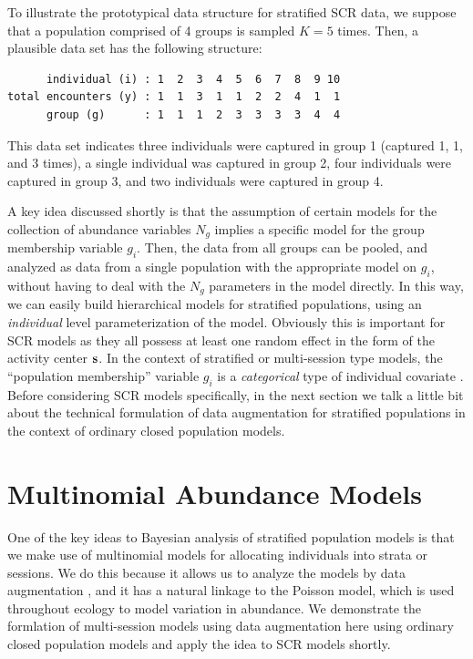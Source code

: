 To illustrate the prototypical data structure for stratified SCR data,
we suppose that a population comprised of 4 groups is sampled
$K=5$ times. Then, a plausible data set has the following structure:
\begin{verbatim}
      individual (i) : 1  2  3  4  5  6  7  8  9 10
total encounters (y) : 1  1  3  1  1  2  2  4  1  1
      group (g)      : 1  1  1  2  3  3  3  3  4  4
\end{verbatim}
This data set indicates three individuals were captured in
group 1 (captured 1, 1, and 3 times), a single individual was
captured in group 2, four individuals were captured in group
3, and two individuals were captured in group 4.

A key idea discussed shortly is that the assumption of certain models
for the collection of abundance variables $N_{g}$ implies a specific
model for the group membership variable $g_{i}$.  Then, the data from
all groups can be pooled, and analyzed as data from a single
population with the appropriate model on $g_{i}$, without having to
deal with the $N_{g}$ parameters in the model directly. In this way,
we can easily build hierarchical models for stratified populations,
using an {\it individual} level parameterization of the
model. Obviously this is important for SCR models as they all possess
at least one random effect in the form of the activity center ${\bf
  s}$.  In the context of stratified or multi-session type models, the
``population membership'' variable $g_{i}$ is a {\it categorical} type
of individual covariate \citep{huggins:1989, alho:1990, royle:2009}.
Before considering SCR models specifically, in the next section we
talk a little bit about the technical formulation of data augmentation
for stratified populations in the context of ordinary closed
population models.


\section{Multinomial Abundance Models}

One of the key ideas to Bayesian analysis of stratified population
models is that we make use of multinomial models for allocating
individuals into strata or sessions. We do this because it allows us
to analyze the models by data augmentation \citep{converse_royle:2012,
  royle_converse:2013}, and it has a natural linkage to the Poisson
model, which is used throughout ecology to model variation in
abundance. We demonstrate the formlation of multi-session models using
data augmentation here using ordinary closed population models and
apply the idea to SCR models shortly.

